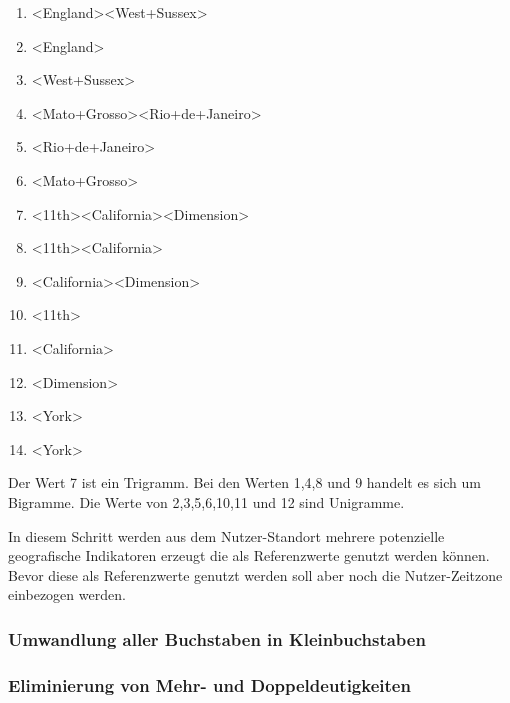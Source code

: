				\begin{multicols}{2}
					\begin{enumerate}
						\item \textless England\textgreater   \textless West+Sussex\textgreater  
						\item \textless England\textgreater  
						\item \textless West+Sussex\textgreater  
						\item \textless Mato+Grosso\textgreater   \textless Rio+de+Janeiro\textgreater  
						\item \textless Rio+de+Janeiro\textgreater  
						\item \textless Mato+Grosso\textgreater  
						\item \textless 11th\textgreater   \textless California\textgreater   \textless Dimension\textgreater   
						\item \textless 11th\textgreater   \textless California\textgreater  
						\item \textless California\textgreater   \textless Dimension\textgreater   
						\item \textless 11th\textgreater  
						\item \textless California\textgreater  
						\item \textless Dimension\textgreater   
						\item \textless York\textgreater  
						\item \textless York\textgreater  
					\end{enumerate}
				\end{multicols}
				Der Wert 7 ist ein Trigramm.
				Bei den Werten 1,4,8 und 9 handelt es sich um Bigramme. 
				Die Werte von 2,3,5,6,10,11 und 12 sind Unigramme.				

				In diesem Schritt werden aus dem Nutzer-Standort mehrere potenzielle geografische Indikatoren erzeugt die als Referenzwerte genutzt werden können.
				Bevor diese als Referenzwerte genutzt werden soll aber noch die Nutzer-Zeitzone einbezogen werden.

			\subsubsection{Umwandlung aller Buchstaben in Kleinbuchstaben}  


			\subsubsection{Eliminierung von Mehr- und Doppeldeutigkeiten}

